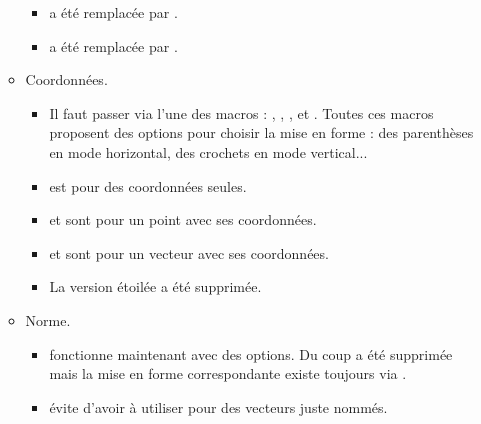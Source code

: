 \begin{itemize}[itemsep=.5em]
\begin{itemize}[itemsep=.5em]
\begin{itemize}[itemsep=.5em, label=$\rightarrow$]
            \item {}  a été remplacée par .

            \item {} a été remplacée par .
	    \end{itemize}


        \item Coordonnées.
        
        \begin{itemize}[itemsep=.5em, label=$\rightarrow$]
            \item Il faut passer via l'une des macros : , , ,  et .
                  Toutes ces macros proposent des options pour choisir la mise en forme : des parenthèses en mode horizontal, des crochets en mode vertical...

            \item {} est pour des coordonnées seules.

            \item {} et  sont pour un point avec ses coordonnées.

            \item {} et  sont pour un vecteur avec ses coordonnées.

            \item La version étoilée  a été supprimée. 
	    \end{itemize}



        \item Norme.
        
        \begin{itemize}[itemsep=.5em, label=$\rightarrow$]
            \item {} fonctionne maintenant avec des options.
                  Du coup  a été supprimée mais la mise en forme correspondante existe toujours via .

			\item {} évite d'avoir à utiliser  pour des vecteurs juste nommés.
	    \end{itemize}
    \end{itemize}





\end{itemize}
